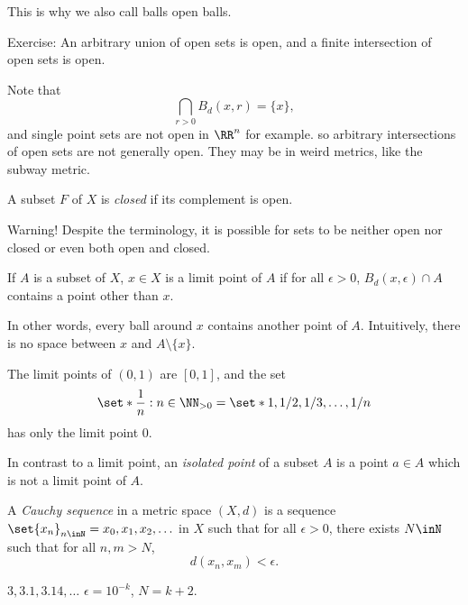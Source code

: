 \documentclass{article}
\begin{document}
This is why we also call balls open balls.

Exercise: An arbitrary union of open sets is open, and
a finite intersection of open sets is open.

Note that 
\[ \bigcap_{r>0} B_d(x,r) = \{x\}, \]
and single point sets are not open in $\RR^n$ for example. so
arbitrary intersections of open sets are not generally open.
They may be in weird metrics, like the subway metric.

\begin{definition}
    A subset $F$ of $X$ is \emph{closed} if its complement is
    open.
\end{definition}

Warning! Despite the terminology, it is possible for
sets to be neither open nor closed or even both open and closed.

\begin{definition}
    If $A$ is a subset of $X$, $x\in X$ is a limit point of $A$ if
    for all $\epsilon > 0$, 
    $B_d(x,\epsilon) \cap A$ contains a point other than $x$.
\end{definition}

In other words, every ball around $x$ contains another point 
of $A$. Intuitively, there is no space between $x$ and $A\setminus \{x\}$.

\begin{example}
    The limit points of $(0,1)$ are $[0,1]$, and
    the set
    \[ \set*{\frac{1}{n} : n\in\NN_{>0}} = \set*{1,1/2,1/3,\ldots,1/n} \] 
    has only the limit point $0$.
\end{example}

\begin{definition}
    In contrast to a limit point, an \emph{isolated point} of a subset $A$
    is a point $a\in A$ which is not a limit point of $A$.
\end{definition}


\begin{definition}
    A \emph{Cauchy sequence} in a metric space $(X,d)$ is a sequence
    $\set{x_n}_{n\inN} = x_0,x_1,x_2,\ldots$
     in $X$ such that for all $\epsilon >0$,
    there exists $N \inN$ such that for all $n,m>N$,
    \[ d(x_n,x_m) < \epsilon. \]
\end{definition}

\begin{example}
    $3,3.1,3.14,\ldots$ $\epsilon = 10^{-k}$, $N=k+2$.
\end{example} 
\end{document}
